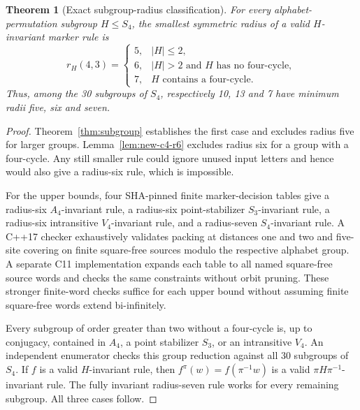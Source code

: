 \documentclass[11pt]{article}
\newtheorem{theorem}{Theorem}
\theoremstyle{remark}
\begin{document}
\begin{theorem}[Exact subgroup-radius classification]
\label{thm:exact-subgroup-radii}
For every alphabet-permutation subgroup $H\le S_4$,
the smallest symmetric radius of a valid
$H$-invariant marker rule is
\[
\boxed{
r_H(4,3)=
\begin{cases}
5,& |H|\le2,\\
6,& |H|>2\text{ and $H$ has no four-cycle},\\
7,& \text{$H$ contains a four-cycle}.
\end{cases}}
\]
Thus, among the 30 subgroups of $S_4$,
respectively 10, 13 and 7 have minimum radii
five, six and seven.
\end{theorem}
\begin{proof}
Theorem~\ref{thm:subgroup} establishes the
first case and excludes radius five for larger
groups. Lemma~\ref{lem:new-c4-r6} excludes
radius six for a group with a four-cycle.
Any still smaller rule could ignore unused
input letters and hence would also give a
radius-six rule, which is impossible.

For the upper bounds, four SHA-pinned finite
marker-decision tables give a radius-six
$A_4$-invariant rule, a radius-six
point-stabilizer $S_3$-invariant rule,
a radius-six intransitive $V_4$-invariant
rule, and a radius-seven $S_4$-invariant
rule. A C++17 checker exhaustively validates packing at
distances one and two and five-site covering on
finite square-free sources modulo the respective
alphabet group. A separate C11 implementation
expands each table to all named square-free
source words and checks the same constraints
without orbit pruning. These stronger finite-word
checks suffice for each upper bound without assuming
finite square-free words extend bi-infinitely.

Every subgroup of order greater than two
without a four-cycle is, up to conjugacy,
contained in $A_4$, a point stabilizer $S_3$,
or an intransitive $V_4$. An independent
enumerator checks this group reduction
against all 30 subgroups of $S_4$.
If $f$ is a valid $H$-invariant rule,
then $f^\pi(w)=f(\pi^{-1}w)$ is a valid
$\pi H\pi^{-1}$-invariant rule.
The fully invariant radius-seven rule works
for every remaining subgroup. All three
cases follow.
\end{proof}
\end{document}
